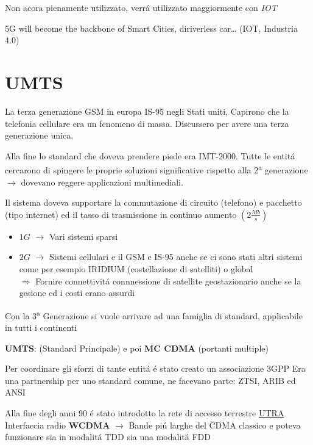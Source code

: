 \documentclass{article}
\begin{document}
Non acora pienamente utilizzato, verr\'a utilizzato maggiormente con \textit{IOT}


5G will become the backbone of Smart Cities, diriverless car… (IOT, Industria 4.0)

\newpage
\section{UMTS}
La terza generazione GSM in europa IS-95 negli Stati uniti, Capirono che la telefonia cellulare era un fenomeno di massa.
Discussero per avere una terza generazione unica.

Alla fine lo standard che doveva prendere piede era IMT-2000. Tutte le entit\'a cercarono di spingere le proprie soluzioni significative rispetto alla 2\textsuperscript{a} generazione $\rightarrow$ dovevano reggere applicazioni multimediali.

Il sistema doveva supportare la commutazione di circuito (telefono) e pacchetto (tipo internet) ed il tasso di trasmissione in continuo aumento $\left(2\frac{Mb}{s}\right)$

\begin{itemize}
    \item $1G$ $\rightarrow$ Vari sistemi sparsi
    \item $2G$ $\rightarrow$ Sistemi cellulari e il GSM e IS-95 anche se ci sono stati altri sistemi come per esempio IRIDIUM (costellazione di satelliti) o global\\
        $\Rightarrow$ Fornire connettivit\'a connnessione di satellite geostazionario anche se la gesione ed i costi erano assurdi
\end{itemize}

Con la 3\textsuperscript{a} Generazione si vuole arrivare ad una famiglia di standard, applicabile in tutti i continenti

\textbf{UMTS}: (Standard Principale) e poi \textbf{MC CDMA} (portanti multiple)


Per coordinare gli sforzi di tante entit\'a \'e stato creato un associazione 3GPP
Era una partnership per uno standard comune, ne facevano parte: ZTSI, ARIB ed ANSI

Alla fine degli anni 90 \'e stato introdotto la rete di accesso terrestre \underline{UTRA}
Interfaccia radio \textbf{WCDMA} $\rightarrow$ Bande pi\'u larghe del CDMA classico e  poteva funzionare sia in modalit\'a TDD sia una modalit\'a FDD
\end{document}
